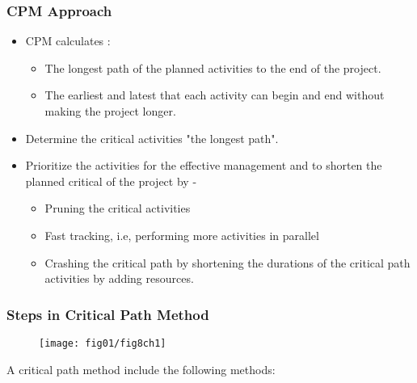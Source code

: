 \subsubsection{CPM Approach\cite{CPM}} 

\begin{itemize}
	\item CPM calculates :
	\begin{itemize}
		\item The longest path of the planned activities to the end of the project.
		\item The earliest and latest that each activity can begin and end without making the project longer.
	\end{itemize}
		\item Determine the critical activities "the longest path".
		\item Prioritize the activities for the effective management and to shorten the planned critical of the project by -
		\begin{itemize}
			\item Pruning the critical activities 
				\item Fast tracking, i.e, performing more activities in parallel 
			\item Crashing the critical path by shortening the durations of the critical path activities by adding resources. 
		\end{itemize}
\end{itemize}



\subsubsection{Steps in Critical Path Method }

\begin{figure}
	\centering
	\texttt{[image: fig01/fig8ch1]}
\end{figure}



A critical path method include the following methods:

